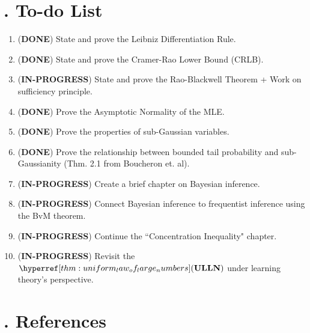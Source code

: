 \newpage

\listoftheorems[ignoreall,show=dfn]

\setcounter{section}{2}


\newpage\section{. To-do List}
\newcommand{\DONE}{(\color{green}\textbf{DONE}\color{black}) }
\newcommand{\NOTDONE}{(\color{red}\textbf{IN-PROGRESS}\color{black}) }
\begin{enumerate}
	\item \DONE State and prove the Leibniz Differentiation Rule.
	\item \DONE State and prove the Cramer-Rao Lower Bound (CRLB).
	\item \NOTDONE State and prove the Rao-Blackwell Theorem + Work on sufficiency principle.
	\item \DONE Prove the Asymptotic Normality of the MLE.
	\item \DONE Prove the properties of sub-Gaussian variables.
	\item \DONE Prove the relationship between bounded tail probability and sub-Gaussianity (Thm. 2.1 from Boucheron et. al).
	\item \NOTDONE Create a brief chapter on Bayesian inference.
	\item \NOTDONE Connect Bayesian inference to frequentist inference using the BvM theorem.
	\item \NOTDONE Continue the ``Concentration Inequality" chapter.
	\item \NOTDONE Revisit the $\ULLN$ under learning theory's perspective.
\end{enumerate} 

\newpage
\section{. References}
\nocite{*}
\printbibliography